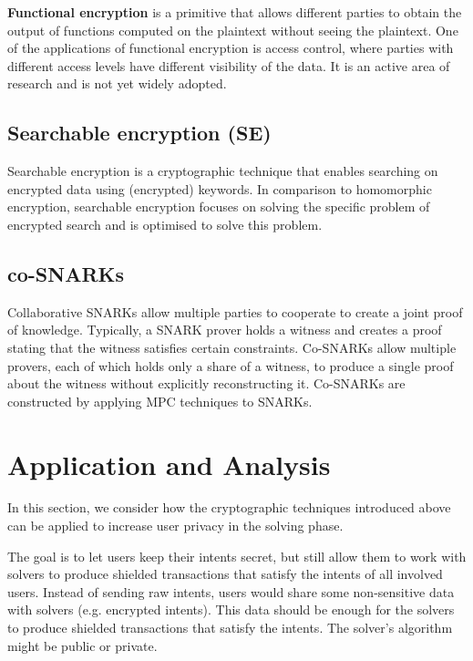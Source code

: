 \documentclass[
    9pt,            %
    report,        %
    affiltop,       %
]{art}
\begin{document}
\textbf{Functional encryption} \cite{fe} is a primitive that allows different parties to obtain the output of functions computed on the plaintext without seeing the plaintext. One of the applications of functional encryption is access control, where parties with different access levels have different visibility of the data. It is an active area of research and is not yet widely adopted.


\subsection{Searchable encryption (SE)}

Searchable encryption \cite{se} is a cryptographic technique that enables searching on encrypted data using (encrypted) keywords. In comparison to homomorphic encryption, searchable encryption focuses on solving the specific problem of encrypted search and is optimised to solve this problem.


\subsection{co-SNARKs}

Collaborative SNARKs \cite{cosnarks} allow multiple parties to cooperate to create a joint proof of knowledge. Typically, a SNARK prover holds a witness and creates a proof stating that the witness satisfies certain constraints. Co-SNARKs allow multiple provers, each of which holds only a share of a witness, to produce a single proof about the witness without explicitly reconstructing it. Co-SNARKs are constructed by applying MPC techniques to SNARKs.

\section{Application and Analysis}

In this section, we consider how the cryptographic techniques introduced above can be applied to increase user privacy in the solving phase.

The goal is to let users keep their intents secret, but still allow them to work with solvers to produce shielded transactions that satisfy the intents of all involved users. Instead of sending raw intents, users would share some non-sensitive data with solvers (e.g. encrypted intents). This data should be enough for the solvers to produce shielded transactions that satisfy the intents. The solver's algorithm might be public or private. 
\end{document}
